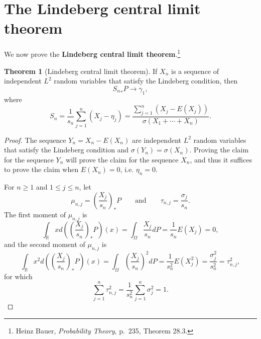 \documentclass{article}
\theoremstyle{definition}
\newtheorem{theorem}{Theorem}
\theoremstyle{definition}
\begin{document}
\section{The Lindeberg central limit theorem}
We now prove the \textbf{Lindeberg central limit theorem}.\footnote{Heinz Bauer,
{\em Probability Theory}, p.~235, Theorem 28.3.}

\begin{theorem}[Lindeberg central limit theorem]
If $X_n$ is a sequence of independent 
 $L^2$ random variables that satisfy the Lindeberg condition, 
then 
\[
{S_n}_*P \to \gamma_1,
\]
where 
\[
S_n = \frac{1}{s_n} \sum_{j=1}^n (X_j-\eta_j) = \frac{\sum_{j=1}^n (X_j-E(X_j))}{\sigma(X_1+\cdots+X_n)}.
\]
\end{theorem}
\begin{proof}
The sequence $Y_n=X_n-E(X_n)$ are independent $L^2$ random variables that satisfy the Lindeberg condition and
$\sigma(Y_n)=\sigma(X_n)$. Proving the claim for the sequence $Y_n$ will prove the claim for the sequence
$X_n$, and thus  it suffices to prove the claim when $E(X_n)=0$, i.e. $\eta_n=0$. 

For $n \geq 1$ and $1 \leq j \leq n$, let
\[
\mu_{n,j} = \left(\frac{X_j}{s_n} \right)_*P \qquad \textrm{and} \qquad \tau_{n,j} = \frac{\sigma_j}{s_n}.
\]
The first moment of $\mu_{n,j}$ is
\[
\int_{\mathbb{R}} x d\left( \left(\frac{X_j}{s_n}\right)_*P\right)(x)
=\int_{\Omega} \frac{X_j}{s_n} dP
=\frac{1}{s_n} E(X_j) = 0,
\]
and the second moment of $\mu_{n,j}$ is
\[
\int_{\mathbb{R}} x^2 d\left( \left(\frac{X_j}{s_n} \right)_*P\right)(x)
=\int_{\Omega} \left(\frac{X_j}{s_n}\right)^2 dP
=\frac{1}{s_n^2} E(X_j^2)
=\frac{\sigma_j^2}{s_n^2}
=\tau_{n,j}^2,
\]
for which
\[
\sum_{j=1}^n \tau_{n,j}^2 = \frac{1}{s_n^2} \sum_{j=1}^n \sigma_j^2 = 1.
\]



\end{proof}
\end{document}
